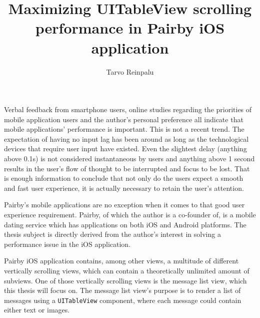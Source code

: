 \documentclass[a4paper,12pt]{article}
\begin{document}
\begin{itkTitlePage}
\title{Maximizing UITableView scrolling performance in Pairby iOS application}
\author{Tarvo Reinpalu}
\end{itkTitlePage}




\itkMakeAuthorDeclaration

\clearpage
\thispagestyle{empty}
\tableofcontents
\newpage




\newpage
{}
Verbal feedback from smartphone users, online studies regarding the priorities of mobile application users\cite{AppSpeedStudyHP}\cite{AppSpeedStudyApigee} and the author's personal preference all indicate that mobile applications' performance is important. This is not a recent trend. The expectation of having no input lag has been around as long as the technological devices that require user input have existed.\cite{NielsenUsabilityEngineering} Even the slightest delay (anything above 0.1s) is not considered instantaneous by users and anything above 1 second results in the user's flow of thought to be interrupted and focus to be lost.\cite{NielsenUsabilityEngineering} That is enough information to conclude that not only do the users expect a smooth and fast user experience, it is actually necessary to retain the user's attention.

Pairby's mobile applications are no exception when it comes to that good user experience requirement. Pairby, of which the author is a co-founder of, is a mobile dating service which has applications on both iOS and Android platforms. The thesis subject is directly derived from the author's interest in solving a performance issue in the iOS application.

Pairby iOS application contains, among other views, a multitude of different vertically scrolling views, which can contain a theoretically unlimited amount of subviews. One of those vertically scrolling views is the message list view, which this thesis will focus on. The message list view's purpose is to render a list of messages using a \texttt{UITableView} component, where each message could contain either text or images.
\end{document}
